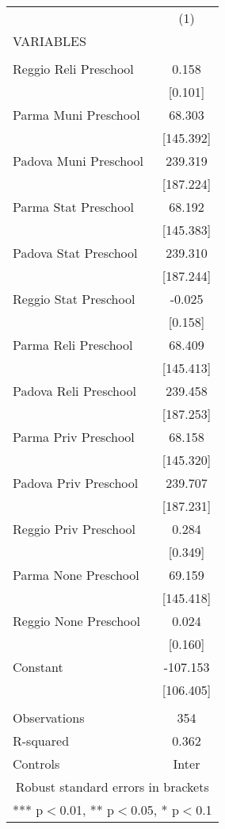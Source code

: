\begin{tabular}{lc} \hline
 & (1) \\
VARIABLES &  \\ \hline
 &  \\
Reggio Reli Preschool & 0.158 \\
 & [0.101] \\
Parma Muni Preschool & 68.303 \\
 & [145.392] \\
Padova Muni Preschool & 239.319 \\
 & [187.224] \\
Parma Stat Preschool & 68.192 \\
 & [145.383] \\
Padova Stat Preschool & 239.310 \\
 & [187.244] \\
Reggio Stat Preschool & -0.025 \\
 & [0.158] \\
Parma Reli Preschool & 68.409 \\
 & [145.413] \\
Padova Reli Preschool & 239.458 \\
 & [187.253] \\
Parma Priv Preschool & 68.158 \\
 & [145.320] \\
Padova Priv Preschool & 239.707 \\
 & [187.231] \\
Reggio Priv Preschool & 0.284 \\
 & [0.349] \\
Parma None Preschool & 69.159 \\
 & [145.418] \\
Reggio None Preschool & 0.024 \\
 & [0.160] \\
Constant & -107.153 \\
 & [106.405] \\
 &  \\
Observations & 354 \\
R-squared & 0.362 \\
 Controls & Inter \\ \hline
\multicolumn{2}{c}{ Robust standard errors in brackets} \\
\multicolumn{2}{c}{ *** p$<$0.01, ** p$<$0.05, * p$<$0.1} \\
\end{tabular}
